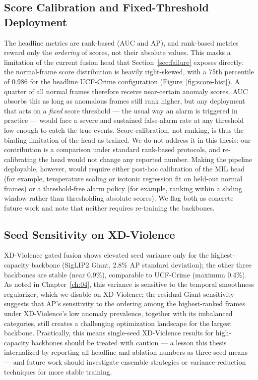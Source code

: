 \subsection{Score Calibration and Fixed-Threshold Deployment}
\label{sec:lim-calibration}

The headline metrics are rank-based (AUC and AP), and rank-based metrics reward
only the \emph{ordering} of scores, not their absolute values. This masks a
limitation of the current fusion head that Section~\ref{sec:failure} exposes
directly: the normal-frame score distribution is heavily right-skewed, with a
75th percentile of $0.986$ for the headline UCF-Crime configuration
(Figure~\ref{fig:score-hist}). A quarter of all normal frames therefore receive
near-certain anomaly scores. AUC absorbs this as long as anomalous frames still
rank higher, but any deployment that acts on a \emph{fixed} score threshold ---
the usual way an alarm is triggered in practice --- would face a severe and
sustained false-alarm rate at any threshold low enough to catch the true
events. Score calibration, not ranking, is thus the binding limitation of the
head as trained. We do not address it in this thesis: our contribution is a
comparison under standard rank-based protocols, and re-calibrating the head
would not change any reported number. Making the pipeline deployable, however,
would require either post-hoc calibration of the MIL head (for example,
temperature scaling or isotonic regression fit on held-out normal frames) or a
threshold-free alarm policy (for example, ranking within a sliding window
rather than thresholding absolute scores). We flag both as concrete future
work and note that neither requires re-training the backbones.

\subsection{Seed Sensitivity on XD-Violence}
\label{sec:lim-seeds}

XD-Violence gated fusion shows elevated seed variance only for the
highest-capacity backbone (SigLIP2 Giant, 2.8\% AP standard deviation); the
other three backbones are stable (near 0.9\%), comparable to UCF-Crime
(maximum 0.4\%). As noted in Chapter~\ref{ch:04}, this variance is sensitive
to the temporal smoothness regularizer, which we disable on XD-Violence; the
residual Giant sensitivity suggests that AP's sensitivity to the ordering
among the highest-ranked frames under XD-Violence's low anomaly prevalence,
together with its imbalanced categories, still creates a challenging
optimization landscape for the largest backbone. Practically, this means single-seed
XD-Violence results for high-capacity backbones should be treated with
caution --- a lesson this thesis internalized by reporting all headline and
ablation numbers as three-seed means --- and future work should investigate
ensemble strategies or variance-reduction techniques for more stable training.


